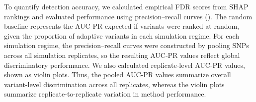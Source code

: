 \documentclass[]{article}
\begin{document}
To quantify detection accuracy,
we calculated empirical FDR scores
from SHAP rankings
and evaluated performance using precision--recall curves
(). The random baseline represents the AUC-PR
expected if variants were ranked at random,
given the proportion of adaptive variants in each simulation regime.
For each simulation regime,
the precision--recall curves were constructed by pooling SNPs
across all simulation replicates,
so the resulting AUC-PR values reflect global discriminatory performance.
We also calculated replicate-level AUC-PR values,
shown as violin plots. %
Thus,
the pooled AUC-PR values summarize overall variant-level discrimination
across all replicates,
whereas the violin plots summarize replicate-to-replicate variation
in method performance.
\end{document}
